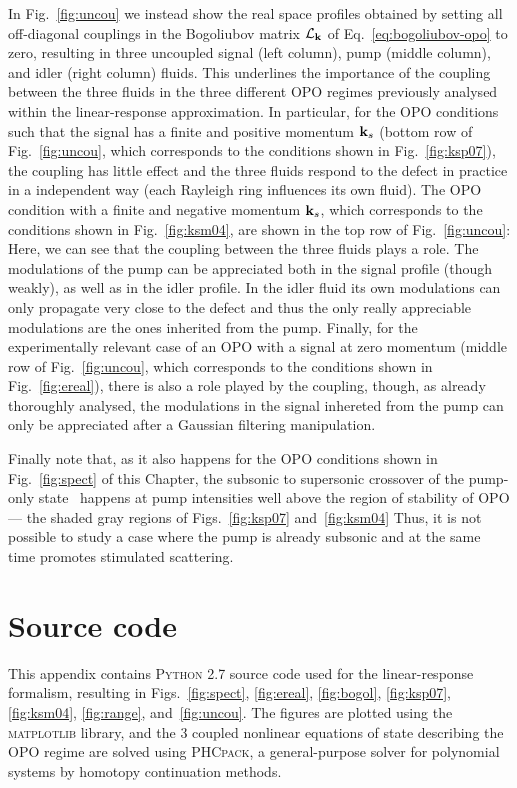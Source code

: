 \begin{subappendices}
In Fig.~\ref{fig:uncou} we instead show the real space profiles
obtained by setting all off-diagonal couplings in the Bogoliubov
matrix $\mathcal{L}_{\mathbf{k}}$ of Eq.~\eqref{eq:bogoliubov-opo} to
zero, resulting in three uncoupled signal (left column), pump (middle
column), and idler (right column) fluids. This underlines the
importance of the coupling between the three fluids in the three
different OPO regimes previously analysed within the linear-response
approximation. In particular, for the OPO conditions such that the
signal has a finite and positive momentum $\mathbf{k}_s$ (bottom row of
Fig.~\ref{fig:uncou}, which corresponds to the conditions shown in
Fig.~\ref{fig:ksp07}), the coupling has little effect and the three
fluids respond to the defect in practice in a independent way (each
Rayleigh ring influences its own fluid). The OPO condition with a
finite and negative momentum $\mathbf{k}_s$, which corresponds to the
conditions shown in Fig.~\ref{fig:ksm04}, are shown in the top row of
Fig.~\ref{fig:uncou}: Here, we can see that the coupling between the
three fluids plays a role. The modulations of the pump can be
appreciated both in the signal profile (though weakly), as well as in
the idler profile. In the idler fluid its own modulations can only
propagate very close to the defect and thus the only really
appreciable modulations are the ones inherited from the pump. Finally,
for the experimentally relevant case of an OPO with a signal at zero
momentum (middle row of Fig.~\ref{fig:uncou}, which corresponds to the
conditions shown in Fig.~\ref{fig:ereal}), there is also a role played
by the coupling, though, as already thoroughly analysed, the
modulations in the signal inhereted from the pump can only be
appreciated after a Gaussian filtering manipulation.


Finally note that, as it also happens for the OPO conditions shown in
Fig.~\ref{fig:spect} of this Chapter, the subsonic to supersonic
crossover of the pump-only state~\cite{Amo_2009} happens at pump
intensities well above the region of stability of OPO --- the shaded
gray regions of Figs.~\ref{fig:ksp07} and~\ref{fig:ksm04} Thus, it is
not possible to study a case where the pump is already subsonic and at
the same time promotes stimulated scattering.

\section{Source code}\label{sec:source-code-opo}
%
This appendix contains \textsc{Python} 2.7 source code used for the
linear-response formalism, resulting in Figs.~\ref{fig:spect},
\ref{fig:ereal}, \ref{fig:bogol}, \ref{fig:ksp07}, \ref{fig:ksm04},
\ref{fig:range}, and~\ref{fig:uncou}. The figures are plotted using
the \textsc{matplotlib} library, and the 3 coupled nonlinear equations
of state describing the OPO regime are solved using \textsc{PHCpack},
a general-purpose solver for polynomial systems by homotopy
continuation methods.
%

\end{subappendices}

